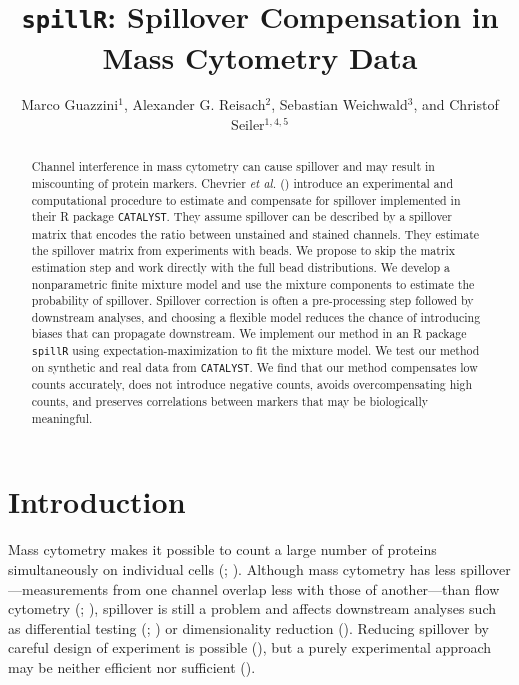 \documentclass[
]{article}
\title{\texttt{spillR}: Spillover Compensation in Mass Cytometry Data}
\author{Marco Guazzini\(^{1}\), Alexander G. Reisach\(^{2}\), Sebastian Weichwald\(^{3}\), and Christof Seiler\(^{1,4,5}\)}
\date{\(^1\)Department of Advanced Computing Sciences, Maastricht University, The Netherlands\\
\(^2\)Université Paris Cité, CNRS, MAP5, F-75006 Paris, France\\
\(^3\)Department of Mathematical Sciences, University of Copenhagen, Denmark\\
\(^4\)Mathematics Centre Maastricht, Maastricht University, The Netherlands\\
\(^5\)Center of Experimental Rheumatology, Department of Rheumatology,\\
University Hospital Zurich, University of Zurich, Switzerland\\
\strut \\
March 16, 2024}
\begin{document}
\maketitle
\begin{abstract}
Channel interference in mass cytometry can cause spillover and may result in miscounting of protein markers. Chevrier \emph{et al.} () introduce an experimental and computational procedure to estimate and compensate for spillover implemented in their R package \texttt{CATALYST}. They assume spillover can be described by a spillover matrix that encodes the ratio between unstained and stained channels. They estimate the spillover matrix from experiments with beads. We propose to skip the matrix estimation step and work directly with the full bead distributions. We develop a nonparametric finite mixture model and use the mixture components to estimate the probability of spillover. Spillover correction is often a pre-processing step followed by downstream analyses, and choosing a flexible model reduces the chance of introducing biases that can propagate downstream. We implement our method in an R package \texttt{spillR} using expectation-maximization to fit the mixture model. We test our method on synthetic and real data from \texttt{CATALYST}. We find that our method compensates low counts accurately, does not introduce negative counts, avoids overcompensating high counts, and preserves correlations between markers that may be biologically meaningful.
\end{abstract}

\section{Introduction}\label{introduction}

Mass cytometry makes it possible to count a large number of proteins simultaneously on individual cells (; ). Although mass cytometry has less spillover---measurements from one channel overlap less with those of another---than flow cytometry (; ), spillover is still a problem and affects downstream analyses such as differential testing (; ) or dimensionality reduction (). Reducing spillover by careful design of experiment is possible (), but a purely experimental approach may be neither efficient nor sufficient ().
\end{document}
